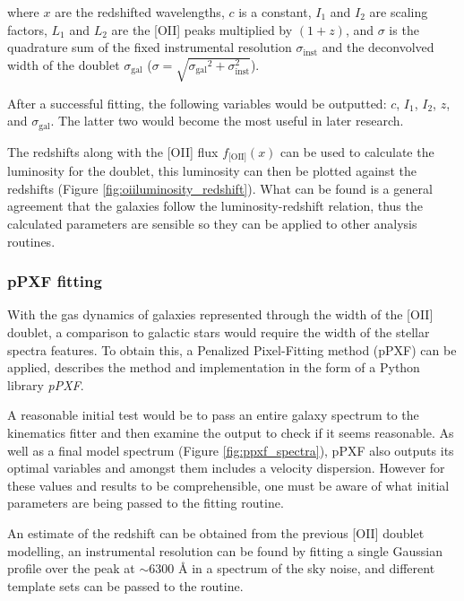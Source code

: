 \documentclass[12pt, twocolumn]{revtex4-1}    %
\begin{document}
where $x$ are the redshifted wavelengths, ${c}$ is a constant, ${I_1}$ and ${I_2}$ are scaling factors, $L_1$ and $L_2$ are the [OII] peaks multiplied by $(1+{z})$, and $\sigma$ is the quadrature sum of the fixed instrumental resolution $\sigma_{\text{inst}}$ and the deconvolved width of the doublet $\sigma_{\text{gal}}$ ($\sigma=\sqrt{{\sigma_{\text{gal}}}^2 + \sigma_{\text{inst}}^2}$).



After a successful fitting, the following variables would be outputted: $c$, $I_1$, $I_2$, $z$, and $\sigma_{\text{gal}}$. The latter two would become the most useful in later research. 

The redshifts along with the [OII] flux $f_{\text{[OII]}}(x)$ can be used to calculate the luminosity for the doublet, this luminosity can then be plotted against the redshifts (Figure \ref{fig:oiiluminosity_redshift}). What can be found is a general agreement that the galaxies follow the luminosity-redshift relation, thus the calculated parameters are sensible so they can be applied to other analysis routines.

\subsubsection*{pPXF fitting}

With the gas dynamics of galaxies represented through the width of the [OII] doublet, a comparison to galactic stars would require the width of the stellar spectra features. To obtain this, a Penalized Pixel-Fitting method (pPXF) can be applied, \cite{cappaellari_ppxf} describes the method and implementation in the form of a Python library \textit{pPXF}.

A reasonable initial test would be to pass an entire galaxy spectrum to the kinematics fitter and then examine the output to check if it seems reasonable. As well as a final model spectrum (Figure \ref{fig:ppxf_spectra}), pPXF also outputs its optimal variables and amongst them includes a velocity dispersion. However for these values and results to be comprehensible, one must be aware of what initial parameters are being passed to the fitting routine. 

An estimate of the redshift can be obtained from the previous [OII] doublet modelling, an instrumental resolution can be found by fitting a single Gaussian profile over the peak at $\sim6300$ {\AA} in a spectrum of the sky noise, and different template sets can be passed to the routine. 
\end{document}
